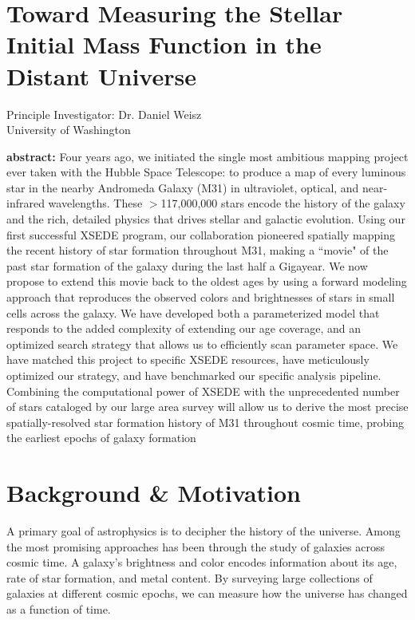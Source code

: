\documentclass[11pt,preprint]{aastex}
\begin{document}
\section*{\Large Toward Measuring the Stellar Initial Mass Function in the Distant Universe}


\begin{center}
Principle Investigator: Dr. Daniel Weisz\\
University of Washington
\end{center}

{\small
{\bf abstract:}
Four years ago, we initiated the single most ambitious mapping project
ever taken with the Hubble Space Telescope: to produce a map of every
luminous star in the nearby Andromeda Galaxy (M31) in ultraviolet,
optical, and near-infrared wavelengths. These $>$117,000,000 stars
encode the history of the galaxy and the rich, detailed physics that
drives stellar and galactic evolution. Using our first successful XSEDE
program, our collaboration pioneered spatially mapping the recent
history of star formation throughout M31, making a ``movie" of the past
star formation of the galaxy during the last half a Gigayear.  We now
propose to extend this movie back to the oldest ages by using a
forward modeling approach that reproduces the observed colors and
brightnesses of stars in small cells across the galaxy. We have
developed both a parameterized model that responds to the added
complexity of extending our age coverage, and an optimized search
strategy that allows us to efficiently scan parameter space.  We have
matched this project to specific XSEDE resources, have meticulously
optimized our strategy, and have benchmarked our specific analysis
pipeline.  Combining the computational power of XSEDE with the
unprecedented number of stars cataloged by our large area survey will
allow us to derive the most precise spatially-resolved star formation
history of M31 throughout cosmic time, probing the earliest epochs of
galaxy formation }


\section{Background \& Motivation}
\label{sec:overview}

A primary goal of astrophysics is to decipher the history of the universe.  Among the most promising approaches has been through the study of galaxies across cosmic time. A galaxy's brightness and color encodes information about its age, rate of star formation, and metal content.  By surveying large collections of galaxies at different cosmic epochs, we can measure how the universe has changed as a function of time.  
\end{document}
